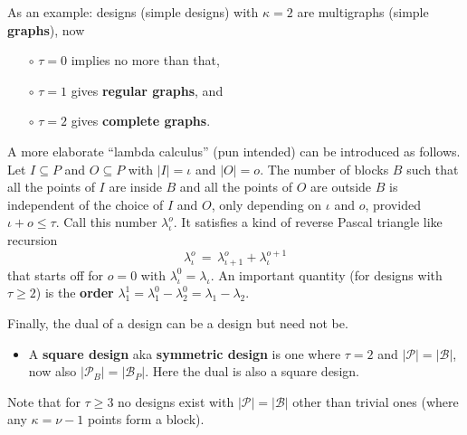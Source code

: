 \documentclass[12pt]{article}
\begin{document}
\clearpage
As an example: designs (simple designs) with $\kappa=2$ are multigraphs
(simple {\bf graphs}), now
%
\begin{itemize}
\item[$\circ$] $\tau=0$ implies no more than that,
\item[$\circ$] $\tau=1$ gives {\bf regular graphs}, and
\item[$\circ$] $\tau=2$ gives {\bf complete graphs}.
\end{itemize}
%
A more elaborate ``lambda calculus'' (pun intended) can be introduced as follows. Let $I\subseteq P$ and $O\subseteq P$ with $|I|=\iota$ and $|O|=o$.  The number of blocks $B$ such that all the points of $I$ are inside $B$ and all the points of $O$ are outside $B$ is independent of the choice of $I$ and $O$, only depending on $\iota$ and $o$, provided $\iota+o\le\tau$. Call this number $\lambda_\iota^o$. It satisfies a kind of reverse Pascal triangle like
recursion
$$
  \lambda_\iota^o \,=\,
  \lambda_{\iota+1}^o +
  \lambda_\iota^{o+1}
$$
that starts off for $o=0$ with $\lambda_\iota^0 = \lambda_\iota$. An important quantity (for designs with $\tau\ge2$) is the {\bf order} $\lambda_1^1 = \lambda_1^0 - \lambda_2^0 = \lambda_1 - \lambda_2$.

Finally, the dual of a design can be a design but need not be.
%
\begin{itemize}

\item A {\bf square design} aka {\bf symmetric design} is one where $\tau=2$
      and $|\mathcal{P}|=|\mathcal{B}|$, now also $|\mathcal{P}_B|=|\mathcal{B}_P|$. Here the dual is also a
      square design.
\end{itemize}
%
Note that for $\tau\ge3$ no designs exist with $|\mathcal{P}|=|\mathcal{B}|$ other than trivial ones (where any $\kappa=\nu-1$ points form a block).
\end{document}
